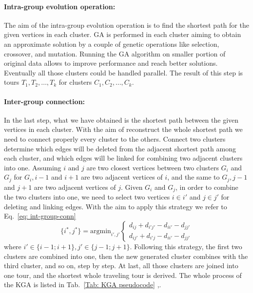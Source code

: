 \paragraph{Intra-group evolution operation:}
The aim of the intra-group evolution operation is to find the shortest path for the given vertices in each cluster.
GA is performed in each cluster aiming to obtain an approximate solution by a couple of genetic operations like selection, crossover, and mutation.
Running the GA algorithm on smaller portion of original data allows to improve performance and reach better solutions.
Eventually all those clusters could be handled parallel.
The result of this step is tours $T_1,T_2,\dots,T_k$ for clusters $C_1,C_2,…,C_k$.
\paragraph{Inter-group connection:}
In the last step, what we have obtained is the shortest path between the given vertices in each cluster.
With the aim of reconstruct the whole shortest path we need to connect properly every cluster to the others.
Connect two clusters determine which edges will be deleted from the adjacent shortest path among each cluster, and which edges will be linked for combining two adjacent clusters into one. 
Assuming $i$ and $j$ are two closest vertices between two clusters $G_i$ and $G_j$ for $G_i,i−1$ and $i+1$ are two adjacent vertices of $i$, and the same to $G_j,j−1$ and $j+1$ are two adjacent vertices of $j$. 
Given $G_i$ and $G_j$, in order to combine the two clusters into one, we need to select two vertices $i \in i′$ and $j \in j'$ for deleting and linking edges.
With the aim to apply this strategy we refer to Eq.~\ref{eq: int-group-conn} 
\begin{equation}
\{i^*,j^*\} = \mathrm{arg min}_{i',j'} 
\begin{cases}
d_{ij} + d_{i'j'} - d_{ii'} - d_{jj'}\\d_{ij'} + d_{i'j} - d_{ii'} - d_{jj'}
\end{cases}
\label{eq: int-group-conn}
\end{equation}
where $i' \in \{i-1; i+1\}, j' \in \{j-1;j+1\}$.
Following this strategy, the first two clusters are combined into one, then the new generated cluster combines with the third cluster, and so on, step by step. At last, all those clusters are joined into one tour, and the shortest whole traveling tour is derived.
The whole process of the KGA is listed in Tab.~\ref{Tab: KGA pseudocode} \cite{ventitre},\cite{ventiquattro}.
